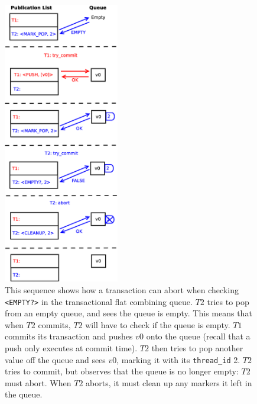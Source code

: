 \begin{figure}[ht!]
\centering
\includegraphics[width=0.45\textwidth]{fcqueue_abort2}
    \caption[Abort and cleanup when checking the empty status of the queue]{This sequence shows how a transaction can abort when checking \texttt{<EMPTY?>} in the transactional flat combining queue. $T2$ tries to pop from an empty queue, and sees the queue is empty. This means that when $T2$ commits, $T2$ will have to check if the queue is empty. $T1$ commits its transaction and pushes $v0$ onto the queue (recall that a push only executes at commit time). $T2$ then tries to pop another value off the queue and sees $v0$, marking it with its \texttt{thread\_id} 2. $T2$ tries to commit, but observes that the queue is no longer empty: $T2$ must abort. When $T2$ aborts, it must clean up any markers it left in the queue.}
\label{fig:fcqueue_abort2}
\end{figure}

